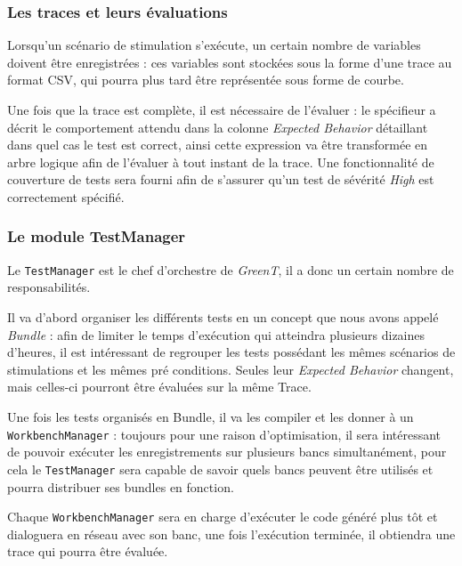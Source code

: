 	\subsubsection{Les traces et leurs évaluations}\label{expectedBehavior}
	Lorsqu'un scénario de stimulation s'exécute, un certain nombre de variables doivent être enregistrées : ces variables sont stockées sous la forme d'une trace au format CSV, qui pourra plus tard être représentée sous forme de courbe. 

	Une fois que la trace est complète, il est nécessaire de l'évaluer : le spécifieur a décrit le comportement attendu dans la colonne \textit{Expected Behavior} détaillant dans quel cas le test est correct, ainsi cette expression va être transformée en arbre logique afin de l'évaluer à tout instant de la trace. Une fonctionnalité de couverture de tests sera fourni afin de s'assurer qu'un test de sévérité \textit{High} est correctement spécifié.

	\subsubsection{Le module TestManager}\label{testManager}
	Le \texttt{TestManager} est le chef d'orchestre de \textit{GreenT}, il a donc un certain nombre de responsabilités. 

	Il va d'abord organiser les différents tests en un concept que nous avons appelé \textit{Bundle} : afin de limiter le temps d'exécution qui atteindra plusieurs dizaines d'heures, il est intéressant de regrouper les tests possédant les mêmes scénarios de stimulations et les mêmes pré conditions. Seules leur \textit{Expected Behavior} changent, mais celles-ci pourront être évaluées sur la même Trace.

	Une fois les tests organisés en Bundle, il va les compiler et les donner à un \texttt{WorkbenchManager} : toujours pour une raison d'optimisation, il sera intéressant de pouvoir exécuter les enregistrements sur plusieurs bancs simultanément, pour cela le \texttt{TestManager} sera capable de savoir quels bancs peuvent être utilisés et pourra distribuer ses bundles en fonction. 

	Chaque \texttt{WorkbenchManager} sera en charge d'exécuter le code généré plus tôt et dialoguera en réseau avec son banc, une fois l'exécution terminée, il obtiendra une trace qui pourra être évaluée.

